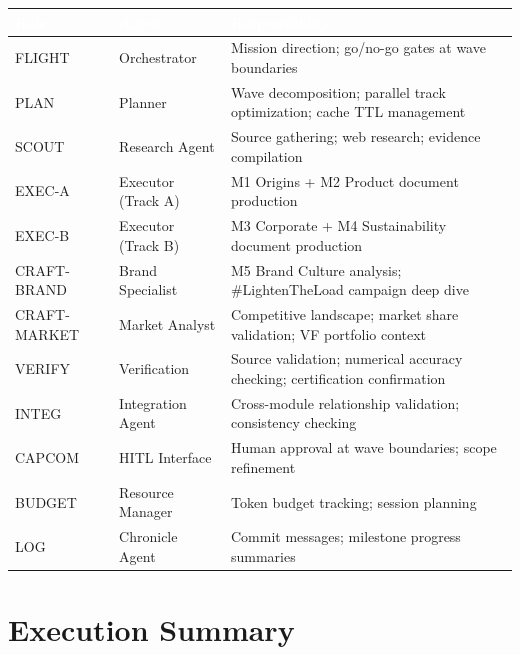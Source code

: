 \documentclass[11pt,letterpaper]{article}
\newcommand{\tableheader}[1]{\textbf{\sffamily\textcolor{white}{#1}}}
\begin{document}
\begin{center}
\begin{tabularx}{\textwidth}{L{2.5cm}L{3cm}X}
\toprule
{}
\tableheader{Role} & \tableheader{Agent} & \tableheader{Responsibility} \\
\midrule
FLIGHT & Orchestrator & Mission direction; go/no-go gates at wave boundaries \\
PLAN & Planner & Wave decomposition; parallel track optimization; cache TTL management \\
SCOUT & Research Agent & Source gathering; web research; evidence compilation \\
EXEC-A & Executor (Track A) & M1 Origins + M2 Product document production \\
EXEC-B & Executor (Track B) & M3 Corporate + M4 Sustainability document production \\
CRAFT-BRAND & Brand Specialist & M5 Brand Culture analysis; \#LightenTheLoad campaign deep dive \\
CRAFT-MARKET & Market Analyst & Competitive landscape; market share validation; VF portfolio context \\
VERIFY & Verification & Source validation; numerical accuracy checking; certification confirmation \\
INTEG & Integration Agent & Cross-module relationship validation; consistency checking \\
CAPCOM & HITL Interface & Human approval at wave boundaries; scope refinement \\
BUDGET & Resource Manager & Token budget tracking; session planning \\
LOG & Chronicle Agent & Commit messages; milestone progress summaries \\
\bottomrule
\end{tabularx}
\end{center}

\section{Execution Summary}
\end{document}
